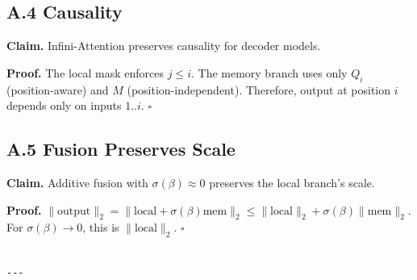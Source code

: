 \subsection{A.4 Causality}

\textbf{Claim.} Infini-Attention preserves causality for decoder models.

\textbf{Proof.} The local mask enforces $j \leq i$. The memory branch uses only 
$Q_i$ (position-aware) and $M$ (position-independent). Therefore, output 
at position $i$ depends only on inputs $1..i$. $\square$

\subsection{A.5 Fusion Preserves Scale}

\textbf{Claim.} Additive fusion with $\sigma(\beta) \approx 0$ preserves the 
local branch's scale.

\textbf{Proof.} $\|\text{output}\|_2 = \|\text{local} + \sigma(\beta) \text{mem}\|_2 \leq \|\text{local}\|_2 + \sigma(\beta)\|\text{mem}\|_2$. 
For $\sigma(\beta) \to 0$, this is $\|\text{local}\|_2$. $\square$
\begin{lstlisting}

---
\end{lstlisting}